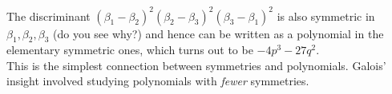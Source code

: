 The discriminant $(\beta_1 - \beta_2)^2(\beta_2 - \beta_3)^2(\beta_3 - \beta_1)^2$ is also symmetric in $ \beta_1, \beta_2, \beta_3$ (do you see why?) and hence can be written as a polynomial in the elementary symmetric ones, which turns out to be $-4p^3 - 27q^2$.\\

 This is the simplest connection between symmetries and polynomials. Galois' insight involved studying polynomials with \emph{fewer} symmetries.


\begin{comment}
	I love the idea of having problems connecting repeated roots, discriminant, and polynomials having same roots. If you can think of some concrete problems feel free to add them here.
\end{comment} 

\begin{comment}
	Polynomials over finite fields might be a little too much. But we can add these questions in as a bonus, optional problems for the more advanced students.
\end{comment}